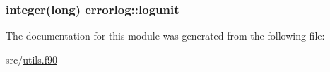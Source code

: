 \hypertarget{classerrorlog_adb26bb2d10f764e895c9745c3fb5dd1d}{
\subsubsection[{logunit}]{\setlength{\rightskip}{0pt plus 5cm}integer(long) errorlog\+::logunit\hspace{0.3cm}{\ttfamily [private]}}}\label{classerrorlog_adb26bb2d10f764e895c9745c3fb5dd1d}


The documentation for this module was generated from the following file\+:\begin{DoxyCompactItemize}
\item 
src/\hyperlink{utils_8f90}{utils.\+f90}\end{DoxyCompactItemize}
